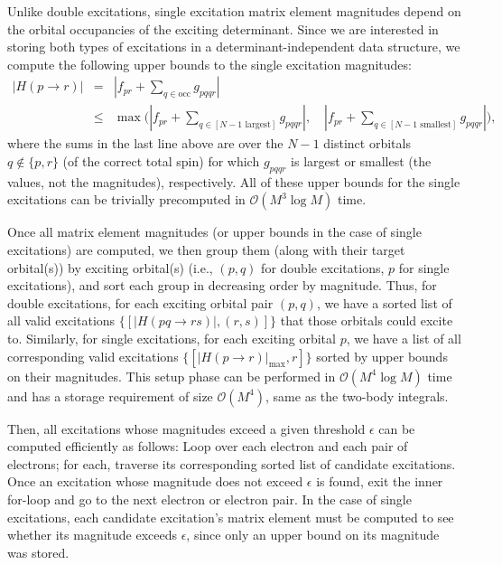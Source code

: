 \documentclass[english]{article}
\begin{document}
Unlike double excitations, single excitation matrix element magnitudes depend on the orbital occupancies of the exciting determinant. Since we are interested in storing both types of excitations in a determinant-independent data structure, we compute the following upper bounds to the single excitation magnitudes:
\begin{eqnarray}
	\left|H(p\rightarrow r)\right| &=& \left|f_{pr} + \sum_{q\in \textrm{occ}} g_{pqqr}\right|\\
	&\le&\max\Bigg( \left|f_{pr} + \sum_{q\in [N-1 \textrm{ largest}]} g_{pqqr}\right|,
	 \quad \left|f_{pr} + \sum_{q\in [N-1 \textrm{ smallest}]} g_{pqqr}\right|\Bigg),
\end{eqnarray}
where the sums in the last line above are over the $N-1$ distinct orbitals $q\notin\{p,r\}$ (of the correct total spin) for which $g_{pqqr}$ is largest or smallest (the values, not the magnitudes), respectively. All of these upper bounds for the single excitations can be trivially precomputed in $\mathcal{O}(M^3\log M)$ time.

Once all matrix element magnitudes (or upper bounds in the case of single excitations) are computed, we then group them (along with their target orbital(s)) by exciting orbital(s) (i.e., $(p,q)$ for double excitations, $p$ for single excitations), and sort each group in decreasing order by magnitude. Thus, for double excitations, for each exciting orbital pair $(p,q)$, we have a sorted list of all valid excitations $\{[|H(pq\rightarrow rs)|, (r,s)]\}$ that those orbitals could excite to. Similarly, for single excitations, for each exciting orbital $p$, we have a list of all corresponding valid excitations $\{[|H(p\rightarrow r)|_\textrm{max}, r]\}$ sorted by upper bounds on their magnitudes. This setup phase can be performed in $\mathcal{O}(M^4\log M)$ time and has a storage requirement of size $\mathcal{O}(M^4)$, same as the two-body integrals.

Then, all excitations whose magnitudes exceed a given threshold $\epsilon$ can be computed efficiently as follows: Loop over each electron and each pair of electrons; for each, traverse its corresponding sorted list of candidate excitations. Once an excitation whose magnitude does not exceed $\epsilon$ is found, exit the inner for-loop and go to the next electron or electron pair. In the case of single excitations, each candidate excitation's matrix element must be computed to see whether its magnitude exceeds $\epsilon$, since only an upper bound on its magnitude was stored.
\end{document}
